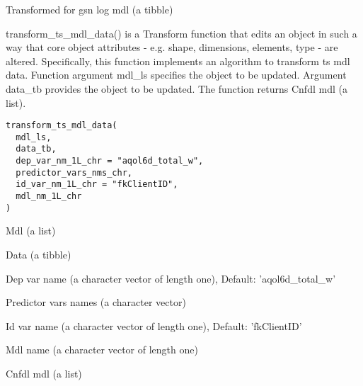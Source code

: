 \documentclass[a4paper]{book}
\begin{document}
%
\begin{Value}
Transformed for gsn log mdl (a tibble)
\end{Value}
%
\begin{Description}\relax
transform\_ts\_mdl\_data() is a Transform function that edits an object in such a way that core object attributes - e.g. shape, dimensions, elements, type - are altered. Specifically, this function implements an algorithm to transform ts mdl data. Function argument mdl\_ls specifies the object to be updated. Argument data\_tb provides the object to be updated. The function returns Cnfdl mdl (a list).
\end{Description}
%
\begin{Usage}
\begin{verbatim}
transform_ts_mdl_data(
  mdl_ls,
  data_tb,
  dep_var_nm_1L_chr = "aqol6d_total_w",
  predictor_vars_nms_chr,
  id_var_nm_1L_chr = "fkClientID",
  mdl_nm_1L_chr
)
\end{verbatim}
\end{Usage}
%
\begin{Arguments}
\begin{ldescription}
\item[\code{mdl\_ls}] Mdl (a list)

\item[\code{data\_tb}] Data (a tibble)

\item[\code{dep\_var\_nm\_1L\_chr}] Dep var name (a character vector of length one), Default: 'aqol6d\_total\_w'

\item[\code{predictor\_vars\_nms\_chr}] Predictor vars names (a character vector)

\item[\code{id\_var\_nm\_1L\_chr}] Id var name (a character vector of length one), Default: 'fkClientID'

\item[\code{mdl\_nm\_1L\_chr}] Mdl name (a character vector of length one)
\end{ldescription}
\end{Arguments}
%
\begin{Value}
Cnfdl mdl (a list)
\end{Value}
\end{document}
